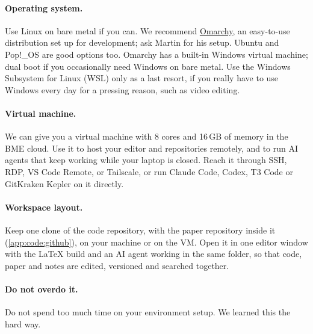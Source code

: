 \paragraph{Operating system.} Use Linux on bare metal if you can. We recommend \href{https://omarchy.org/}{Omarchy}, an easy-to-use distribution set up for development; ask Martin for his setup. Ubuntu and Pop!\_OS are good options too. Omarchy has a built-in Windows virtual machine; dual boot if you occasionally need Windows on bare metal. Use the Windows Subsystem for Linux (WSL) only as a last resort, if you really have to use Windows every day for a pressing reason, such as video editing.

\paragraph{Virtual machine.} We can give you a virtual machine with 8 cores and 16\,GB of memory in the BME cloud. Use it to host your editor and repositories remotely, and to run AI agents that keep working while your laptop is closed. Reach it through SSH, RDP, VS Code Remote, or Tailscale, or run Claude Code, Codex, T3 Code or GitKraken Kepler on it directly.

\paragraph{Workspace layout.} Keep one clone of the code repository, with the paper repository inside it (\cref{app:code:github}), on your machine or on the VM. Open it in one editor window with the \LaTeX{} build and an AI agent working in the same folder, so that code, paper and notes are edited, versioned and searched together.

\paragraph{Do not overdo it.} Do not spend too much time on your environment setup. We learned this the hard way.

